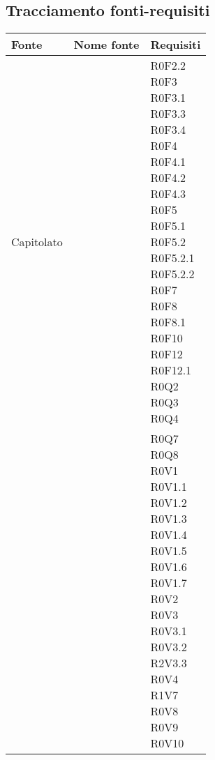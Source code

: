 \documentclass[AnalisiDeiRequisiti.tex]{subfiles}
\begin{document}
\subsection{Tracciamento fonti-requisiti}

\label{table:Tabella di tracciamento fonti-requisiti}


\renewcommand*{\arraystretch}{1.2}
\begin{longtable}[H]{p{2cm}p{5cm}p{5cm}}
	\rowcolor{CHeader} 
	\color{CHeaderText} \textbf{Fonte} & \color{CHeaderText} \textbf{Nome fonte} & \color{CHeaderText} \textbf{Requisiti} \\  
	\endhead
	Capitolato & & \makecell[tl]{ R0F2.2 \\
	 R0F3 \\
	 R0F3.1 \\
	 R0F3.3 \\
	 R0F3.4 \\
	 R0F4 \\
	 R0F4.1 \\
	 R0F4.2 \\
	 R0F4.3 \\
	 R0F5 \\
	 R0F5.1 \\
	 R0F5.2 \\
	 R0F5.2.1 \\
	 R0F5.2.2 \\
	 R0F7 \\
	 R0F8 \\
	 R0F8.1 \\
	 R0F10 \\
	 R0F12\\
	 R0F12.1 \\
	 R0Q2 \\
	 R0Q3 \\
	 R0Q4 
 	} \\
 	\rowcolor{CRigheDispari}
 	& & \makecell[tl]{
	 R0Q7 \\
	 R0Q8 \\
	 R0V1 \\
	 R0V1.1 \\
	 R0V1.2 \\
	 R0V1.3 \\
	 R0V1.4 \\
	 R0V1.5 \\
	 R0V1.6 \\
	 R0V1.7 \\
	 R0V2 \\
	 R0V3 \\
	 R0V3.1 \\
	 R0V3.2 \\
	 R2V3.3 \\
	 R0V4 \\
	 R1V7 \\
	 R0V8 \\
	 R0V9 \\
	 R0V10 } \\
	

\end{longtable}
\end{document}
